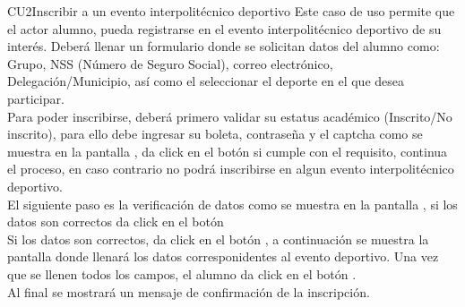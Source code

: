 \begin{UseCase}{CU2}{Inscribir a un evento interpolitécnico deportivo}{
		\noindent Este caso de uso permite que el actor alumno, pueda registrarse en el evento interpolitécnico deportivo de su interés. Deberá llenar un formulario donde se solicitan datos del alumno como: Grupo, NSS (Número de Seguro Social), correo electrónico, Delegación/Municipio, así como el seleccionar el deporte en el que desea participar.\\
		Para poder inscribirse, deberá primero validar su estatus académico (Inscrito/No inscrito), para ello debe ingresar su boleta, contraseña y el captcha como se muestra en la pantalla , da click en el botón  si cumple con el requisito, continua el proceso, en caso contrario no podrá inscribirse en algun evento interpolitécnico deportivo.\\
		El siguiente paso es la verificación de datos como se muestra en la pantalla , si los datos son correctos da click en el botón \\
		Si los datos son correctos, da click en el botón , a continuación se muestra la pantalla  donde llenará los datos corresponidentes al evento deportivo. Una vez que se llenen todos los campos, el alumno da click en el botón .\\ 
		Al final se mostrará un mensaje de confirmación de la inscripción.
	} \label{CU2_Inscribirauneventointerpolitécnicodeportivo}
\end{UseCase}
